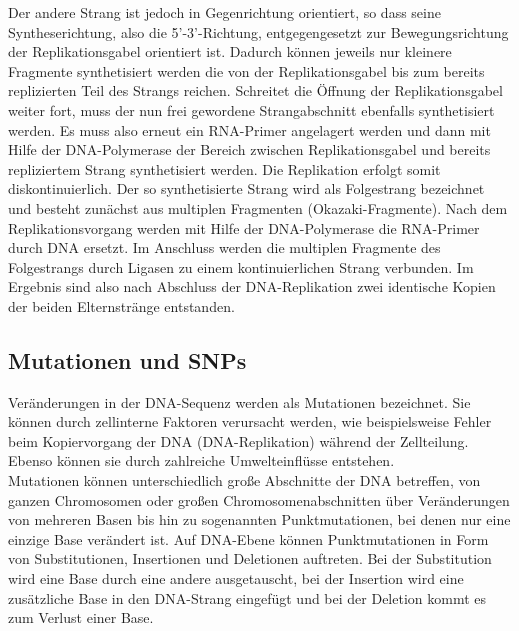 Der andere Strang ist jedoch in Gegenrichtung orientiert, so dass seine Syntheserichtung, also die 5'-3'-Richtung, entgegengesetzt zur Bewegungsrichtung der Replikationsgabel orientiert ist. Dadurch können jeweils nur kleinere Fragmente synthetisiert werden die von der Replikationsgabel bis zum bereits replizierten Teil des Strangs reichen. Schreitet die Öffnung der Replikationsgabel weiter fort, muss der nun frei gewordene Strangabschnitt ebenfalls synthetisiert werden. Es muss also erneut ein RNA-Primer angelagert werden und dann mit Hilfe der DNA-Polymerase der Bereich zwischen Replikationsgabel und bereits repliziertem Strang synthetisiert werden. Die Replikation erfolgt somit diskontinuierlich. Der so synthetisierte Strang wird als Folgestrang bezeichnet und besteht zunächst aus multiplen Fragmenten (Okazaki-Fragmente). Nach dem Replikationsvorgang werden mit Hilfe der DNA-Polymerase die RNA-Primer durch DNA ersetzt. Im Anschluss werden die multiplen Fragmente des Folgestrangs durch Ligasen zu einem kontinuierlichen Strang verbunden. Im Ergebnis sind also nach Abschluss der DNA-Replikation zwei identische Kopien der beiden Elternstränge entstanden.\\

\subsection{Mutationen und SNPs} \label{subsec:mutation}

Veränderungen in der DNA-Sequenz werden als Mutationen bezeichnet. Sie können durch zellinterne Faktoren verursacht werden, wie beispielsweise Fehler beim Kopiervorgang der DNA (DNA-Replikation) während der Zellteilung. Ebenso können sie durch zahlreiche Umwelteinflüsse entstehen. \\

Mutationen können unterschiedlich große Abschnitte der DNA betreffen, von ganzen Chromosomen oder großen Chromosomenabschnitten über Veränderungen von mehreren Basen bis hin zu sogenannten Punktmutationen, bei denen nur eine einzige Base verändert ist. Auf DNA-Ebene können Punktmutationen in Form von Substitutionen, Insertionen und Deletionen auftreten. Bei der Substitution wird eine Base durch eine andere ausgetauscht, bei der Insertion wird eine zusätzliche Base in den DNA-Strang eingefügt und bei der Deletion kommt es zum Verlust einer Base. \\

